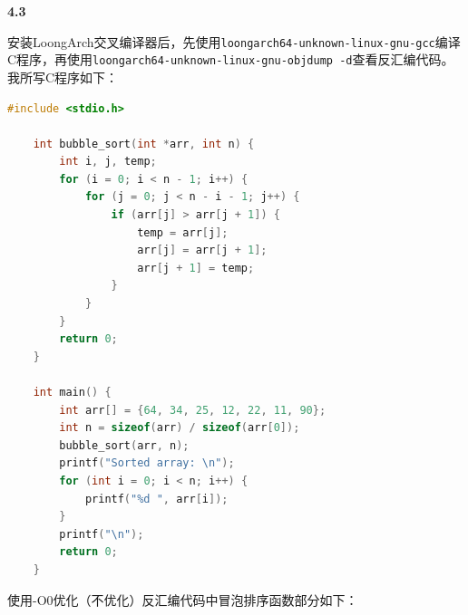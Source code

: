 \documentclass[UTF8]{report}
\begin{document}
\noindent
\textbf{4.3}

安装LoongArch交叉编译器后，先使用\texttt{loongarch64-unknown-linux-gnu-gcc}编译C程序，再使用\texttt{loongarch64-unknown-linux-gnu-objdump -d}查看反汇编代码。我所写C程序如下：
  
  \begin{lstlisting}[language=C]
    #include <stdio.h>

    int bubble_sort(int *arr, int n) {
        int i, j, temp;
        for (i = 0; i < n - 1; i++) {
            for (j = 0; j < n - i - 1; j++) {
                if (arr[j] > arr[j + 1]) {
                    temp = arr[j];
                    arr[j] = arr[j + 1];
                    arr[j + 1] = temp;
                }
            }
        }
        return 0;
    }
    
    int main() {
        int arr[] = {64, 34, 25, 12, 22, 11, 90};
        int n = sizeof(arr) / sizeof(arr[0]);
        bubble_sort(arr, n);
        printf("Sorted array: \n");
        for (int i = 0; i < n; i++) {
            printf("%d ", arr[i]);
        }
        printf("\n");
        return 0;
    }
  \end{lstlisting}

  使用-O0优化（不优化）反汇编代码中冒泡排序函数部分如下：
\end{document}
